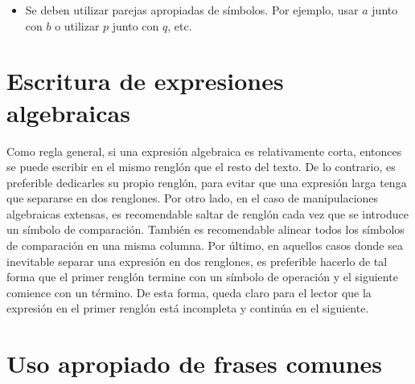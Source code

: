 \begin{itemize}
    \item Se deben utilizar parejas apropiadas de símbolos. Por ejemplo, usar
    $a$ junto con $b$ o utilizar $p$ junto con $q$, etc.

\end{itemize}

\section{Escritura de expresiones algebraicas}

Como regla general, si una expresión algebraica es relativamente corta,
entonces se puede escribir en el mismo renglón que el resto del texto.
De lo contrario, es preferible dedicarles su propio renglón, para evitar 
que una expresión larga tenga que separarse en dos renglones. 
Por otro lado, en el caso de manipulaciones algebraicas extensas, es 
recomendable saltar de renglón cada vez que se introduce
un símbolo de comparación. También es recomendable alinear todos los
símbolos de comparación en una misma columna. Por último, en aquellos
casos donde sea inevitable separar una expresión en dos renglones, es 
preferible hacerlo de tal forma que el primer renglón termine con un 
símbolo de operación y el siguiente comience con un término. De esta forma,
queda claro para el lector que la expresión en el primer renglón
está incompleta y continúa en el siguiente. 

\section{Uso apropiado de frases comunes}

